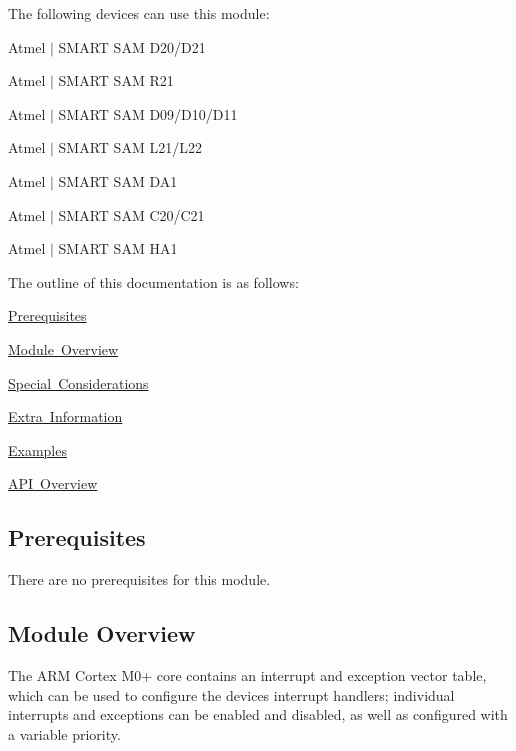 The following devices can use this module\+:
\begin{DoxyItemize}
\item Atmel $\vert$ S\+M\+A\+RT S\+AM D20/\+D21
\item Atmel $\vert$ S\+M\+A\+RT S\+AM R21
\item Atmel $\vert$ S\+M\+A\+RT S\+AM D09/\+D10/\+D11
\item Atmel $\vert$ S\+M\+A\+RT S\+AM L21/\+L22
\item Atmel $\vert$ S\+M\+A\+RT S\+AM D\+A1
\item Atmel $\vert$ S\+M\+A\+RT S\+AM C20/\+C21
\item Atmel $\vert$ S\+M\+A\+RT S\+AM H\+A1
\end{DoxyItemize}

The outline of this documentation is as follows\+:
\begin{DoxyItemize}
\item \mbox{\hyperlink{group__asfdoc__sam0__system__interrupt__group_asfdoc_sam0_system_interrupt_prerequisites}{Prerequisites}}
\item \mbox{\hyperlink{group__asfdoc__sam0__system__interrupt__group_asfdoc_sam0_system_interrupt_module_overview}{Module Overview}}
\item \mbox{\hyperlink{group__asfdoc__sam0__system__interrupt__group_asfdoc_sam0_system_interrupt_special_considerations}{Special Considerations}}
\item \mbox{\hyperlink{group__asfdoc__sam0__system__interrupt__group_asfdoc_sam0_system_interrupt_extra_info}{Extra Information}}
\item \mbox{\hyperlink{group__asfdoc__sam0__system__interrupt__group_asfdoc_sam0_system_interrupt_examples}{Examples}}
\item \mbox{\hyperlink{group__asfdoc__sam0__system__interrupt__group_asfdoc_sam0_system_interrupt_api_overview}{A\+PI Overview}}
\end{DoxyItemize}\hypertarget{group__asfdoc__sam0__system__interrupt__group_asfdoc_sam0_system_interrupt_prerequisites}{}\subsection{Prerequisites}\label{group__asfdoc__sam0__system__interrupt__group_asfdoc_sam0_system_interrupt_prerequisites}
There are no prerequisites for this module.\hypertarget{group__asfdoc__sam0__system__interrupt__group_asfdoc_sam0_system_interrupt_module_overview}{}\subsection{Module Overview}\label{group__asfdoc__sam0__system__interrupt__group_asfdoc_sam0_system_interrupt_module_overview}
The A\+RM\textregistered{} Cortex\textregistered{} M0+ core contains an interrupt and exception vector table, which can be used to configure the device\textquotesingle{}s interrupt handlers; individual interrupts and exceptions can be enabled and disabled, as well as configured with a variable priority.

